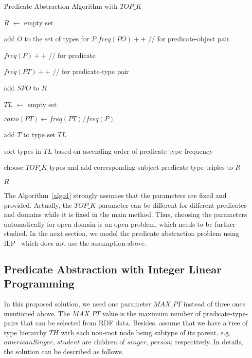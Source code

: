 \documentclass{acm_proc_article-sp}
\begin{document}
\begin{algorithm}
\label{algo1}
\caption{Predicate Abstraction Algorithm with $TOP\_K$}

\SetAlgoLined
{}
$R$ $\leftarrow$ empty set

 {
	 {
		add $O$ to the set of types for $P$
	}
	$freq(PO)++$  //  for predicate-object pair

	$freq(P)++$  //  for predicate
}

 {
	 {
		$freq(PT)++$  //  for predicate-type pair
	}
}

 {
	 {
		add $SPO$ to $R$
	}
}
 {

	$TL$ $\leftarrow$ empty set

	 {
		$ratio(PT) \leftarrow freq(PT) / freq(P)$

		 {
			add $T$ to type set $TL$
		}
	}
	sort types in $TL$ based on ascending order of predicate-type frequency

	choose $TOP\_K$ types and add corresponding subject-predicate-type triples to $R$

}

\Return $R$

\end{algorithm}

The Algorithm~\ref{algo1} strongly assumes that the parameters are fixed and provided. Actually, the $TOP\_K$ parameter can be different for different predicates and domains while it is fixed in the main method. Thus, choosing the parameters automatically for open domain is an open problem, which needs to be further studied. In the next section, we model the predicate abstraction problem using ILP~\cite{ref1} which does not use the assumption above.

\subsection{Predicate Abstraction with Integer Linear Programming}

In this proposed solution, we need one parameter $MAX\_PT$ instead of three ones mentioned above. The $MAX\_PT$ value is the maximum number of predicate-type-pairs that can be selected from RDF data. Besides, assume that we have a tree of type hierarchy $TH$ with each non-root node being subtype of its parent, e.g, $americanSinger$, $student$ are children of $singer$, $person$; respectively. In details, the solution can be described as follows.
\end{document}
